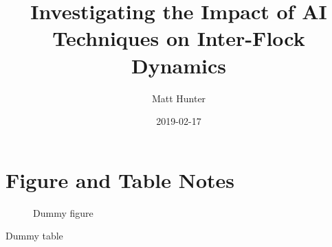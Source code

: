 \documentclass{article} %
\title{Investigating the Impact of AI Techniques on Inter-Flock Dynamics}
\date{2019-02-17}
\author{Matt Hunter}
\begin{document}

\maketitle
\newpage

\doublespacing

	\tableofcontents
	
	\listoffigures
	\listoftables

\newpage
{} 
\singlespacing

	
	
\newpage

	

\newpage


\newpage
	
	

\newpage

	\section{Figure and Table Notes}

	\begin{figure}
	 	\caption{Dummy figure}
	\end{figure}
	
	\begin{table}
	 	\caption{Dummy table}
	\end{table}

\newpage

	
	
	
\end{document}
